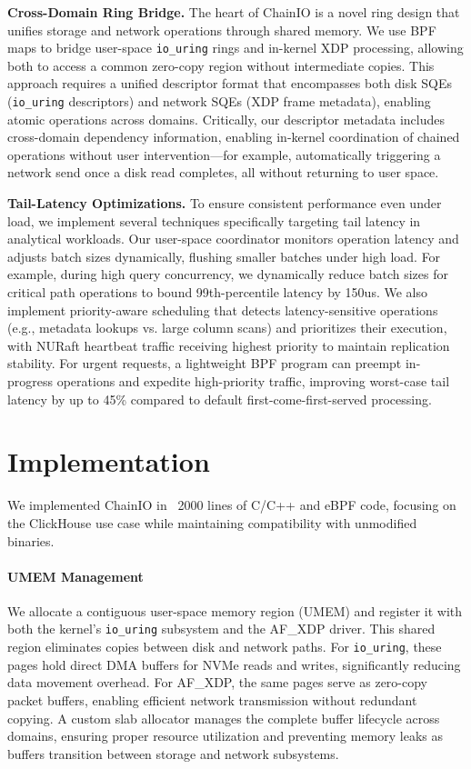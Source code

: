 \documentclass[sigconf,10pt]{acmart}
\newcommand{\sys}{ChainIO\xspace}
\begin{document}
\textbf{Cross-Domain Ring Bridge.} The heart of \sys is a novel ring design that unifies storage and network operations through shared memory. We use BPF maps to bridge user-space \texttt{io\_uring} rings and in-kernel XDP processing, allowing both to access a common zero-copy region without intermediate copies. This approach requires a unified descriptor format that encompasses both disk SQEs (\texttt{io\_uring} descriptors) and network SQEs (XDP frame metadata), enabling atomic operations across domains. Critically, our descriptor metadata includes cross-domain dependency information, enabling in-kernel coordination of chained operations without user intervention—for example, automatically triggering a network send once a disk read completes, all without returning to user space.

\textbf{Tail-Latency Optimizations.} To ensure consistent performance even under load, we implement several techniques specifically targeting tail latency in analytical workloads. Our user-space coordinator monitors operation latency and adjusts batch sizes dynamically, flushing smaller batches under high load. For example, during high query concurrency, we dynamically reduce batch sizes for critical path operations to bound 99th-percentile latency by 150us. We also implement priority-aware scheduling that detects latency-sensitive operations (e.g., metadata lookups vs. large column scans) and prioritizes their execution, with NURaft heartbeat traffic receiving highest priority to maintain replication stability. For urgent requests, a lightweight BPF program can preempt in-progress operations and expedite high-priority traffic, improving worst-case tail latency by up to 45\% compared to default first-come-first-served processing.

\section{Implementation}\label{sec:implementation}

We implemented \sys in ~2000 lines of C/C++ and eBPF code, focusing on the ClickHouse use case while maintaining compatibility with unmodified binaries.

\paragraph{UMEM Management}
We allocate a contiguous user-space memory region (UMEM) and register it with both the kernel's \texttt{io\_uring} subsystem and the AF\_XDP driver. This shared region eliminates copies between disk and network paths. For \texttt{io\_uring}, these pages hold direct DMA buffers for NVMe reads and writes, significantly reducing data movement overhead. For AF\_XDP, the same pages serve as zero-copy packet buffers, enabling efficient network transmission without redundant copying. A custom slab allocator manages the complete buffer lifecycle across domains, ensuring proper resource utilization and preventing memory leaks as buffers transition between storage and network subsystems.
\end{document}

